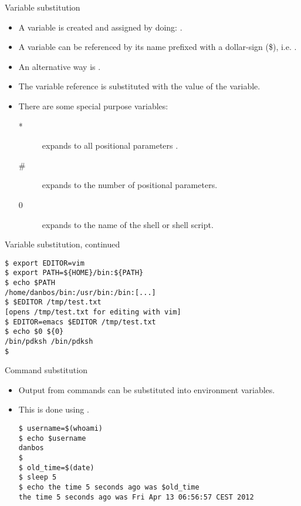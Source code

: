 \documentclass{beamer}
\begin{document}
\begin{frame}{Variable substitution}
	\begin{itemize}
		\item<1-3> A variable is created and assigned by doing: 
			.
		\item<2-3> A variable can be referenced by its name prefixed with 
			a dollar-sign (\$), i.e. .
		\item<2-3> An alternative way is .
		\item<3> The variable reference is substituted with the value of the 
			variable.
		\item<4> There are some special purpose variables:
			\begin{description}
				\item[*] expands to all positional parameters .
				\item[\#] expands to the number of positional parameters.
				\item[0] expands to the name of the shell or shell script.
			\end{description}
	\end{itemize}
\end{frame}
\begin{frame}[fragile]{Variable substitution, continued}
	\begin{lstlisting}
$ export EDITOR=vim
$ export PATH=${HOME}/bin:${PATH}
$ echo $PATH
/home/danbos/bin:/usr/bin:/bin:[...]
$ $EDITOR /tmp/test.txt
[opens /tmp/test.txt for editing with vim]
$ EDITOR=emacs $EDITOR /tmp/test.txt
$ echo $0 ${0}
/bin/pdksh /bin/pdksh
$
	\end{lstlisting}
\end{frame}
\begin{frame}[fragile]{Command substitution}
	\begin{itemize}
		\item<1-2> Output from commands can be substituted into environment 
			variables.
		\item<2> This is done using .
			\begin{lstlisting}
$ username=$(whoami)
$ echo $username
danbos
$
$ old_time=$(date)
$ sleep 5
$ echo the time 5 seconds ago was $old_time
the time 5 seconds ago was Fri Apr 13 06:56:57 CEST 2012
			\end{lstlisting}
	\end{itemize}
\end{frame}
\end{document}
